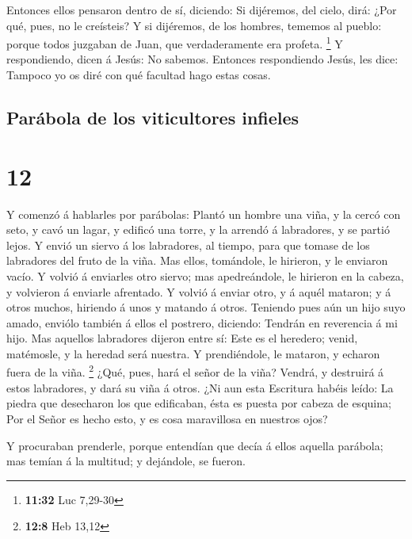  Entonces ellos pensaron dentro de sí, diciendo: Si
dijéremos, del cielo, dirá: ¿Por qué, pues, no le creísteis?
 Y si dijéremos, de los hombres, tememos al pueblo: porque
todos juzgaban de Juan, que verdaderamente era profeta. \footnote{\textbf{11:32}
  Luc 7,29-30}  Y respondiendo, dicen á Jesús: No sabemos.
Entonces respondiendo Jesús, les dice: Tampoco yo os diré con qué
facultad hago estas cosas.

\hypertarget{paruxe1bola-de-los-viticultores-infieles}{%
\subsection{Parábola de los viticultores
infieles}\label{paruxe1bola-de-los-viticultores-infieles}}

\hypertarget{section-11}{%
\section{12}\label{section-11}}

 Y comenzó á hablarles por parábolas: Plantó un hombre una
viña, y la cercó con seto, y cavó un lagar, y edificó una torre, y la
arrendó á labradores, y se partió lejos.  Y envió un siervo
á los labradores, al tiempo, para que tomase de los labradores del fruto
de la viña.  Mas ellos, tomándole, le hirieron, y le
enviaron vacío.  Y volvió á enviarles otro siervo; mas
apedreándole, le hirieron en la cabeza, y volvieron á enviarle
afrentado.  Y volvió á enviar otro, y á aquél mataron; y á
otros muchos, hiriendo á unos y matando á otros.  Teniendo
pues aún un hijo suyo amado, enviólo también á ellos el postrero,
diciendo: Tendrán en reverencia á mi hijo.  Mas aquellos
labradores dijeron entre sí: Este es el heredero; venid, matémosle, y la
heredad será nuestra.  Y prendiéndole, le mataron, y echaron
fuera de la viña. \footnote{\textbf{12:8} Heb 13,12}  ¿Qué,
pues, hará el señor de la viña? Vendrá, y destruirá á estos labradores,
y dará su viña á otros.  ¿Ni aun esta Escritura habéis
leído: La piedra que desecharon los que edificaban, ésta es puesta por
cabeza de esquina;  Por el Señor es hecho esto, y es cosa
maravillosa en nuestros ojos?

 Y procuraban prenderle, porque entendían que decía á ellos
aquella parábola; mas temían á la multitud; y dejándole, se fueron.

